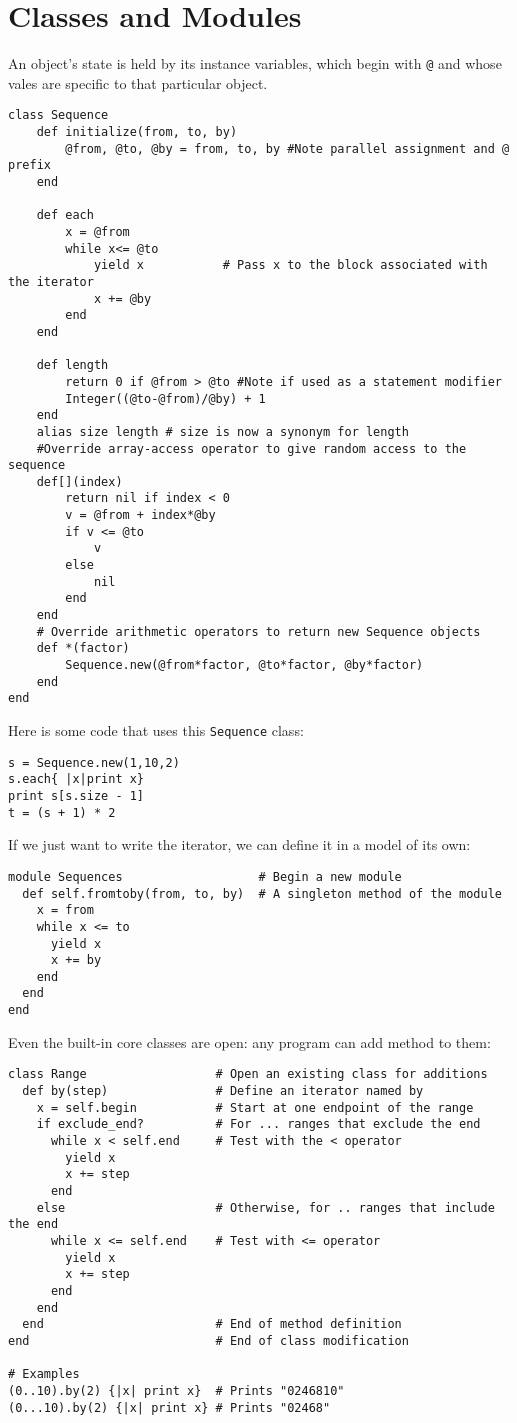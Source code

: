 \documentclass[11pt, a4paper]{book}
\begin{document}
\section{Classes and Modules}
An object's state is held by its instance variables, which begin with \verb|@|
and whose vales are specific to that particular object.
\begin{verbatim}
class Sequence
    def initialize(from, to, by)
        @from, @to, @by = from, to, by #Note parallel assignment and @ prefix
    end

    def each
        x = @from
        while x<= @to
            yield x           # Pass x to the block associated with the iterator
            x += @by
        end
    end

    def length
        return 0 if @from > @to #Note if used as a statement modifier
        Integer((@to-@from)/@by) + 1
    end
    alias size length # size is now a synonym for length
    #Override array-access operator to give random access to the sequence
    def[](index)
        return nil if index < 0
        v = @from + index*@by
        if v <= @to
            v
        else
            nil
        end
    end
    # Override arithmetic operators to return new Sequence objects
    def *(factor)
        Sequence.new(@from*factor, @to*factor, @by*factor)
    end
end
\end{verbatim}
Here is some code that uses this \verb|Sequence| class:
\begin{verbatim}
s = Sequence.new(1,10,2)
s.each{ |x|print x}
print s[s.size - 1]
t = (s + 1) * 2
\end{verbatim}
If we just want to write the iterator, we can define it in a model of its own:
\begin{verbatim}
module Sequences                   # Begin a new module
  def self.fromtoby(from, to, by)  # A singleton method of the module
    x = from
    while x <= to
      yield x
      x += by
    end
  end
end
\end{verbatim}

Even the built-in core classes are open: any program can add method to them:
\begin{verbatim}
class Range                  # Open an existing class for additions
  def by(step)               # Define an iterator named by
    x = self.begin           # Start at one endpoint of the range
    if exclude_end?          # For ... ranges that exclude the end
      while x < self.end     # Test with the < operator
        yield x
        x += step
      end
    else                     # Otherwise, for .. ranges that include the end
      while x <= self.end    # Test with <= operator
        yield x
        x += step
      end
    end
  end                        # End of method definition
end                          # End of class modification

# Examples
(0..10).by(2) {|x| print x}  # Prints "0246810"
(0...10).by(2) {|x| print x} # Prints "02468"
\end{verbatim}
\end{document}
